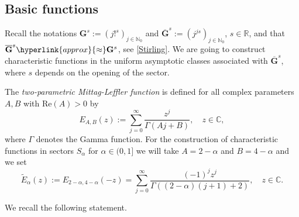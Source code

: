 \documentclass[11pt,a4paper]{article}
\theoremstyle{plain}
\theoremstyle{definition}
\newcommand{\RR}{\mathbb{R}}
\newcommand{\CC}{\mathbb{C}}
\newcommand{\NN}{\mathbb{N}}
\newcommand{\G}{\mathbf{G}}
\renewcommand{\Re}{\text{Re}}
\begin{document}
\subsection{Basic functions}\label{ssect.BasicFct}

Recall the notations {$\G^s:=(j!^s)_{j\in\NN_0}$ and }$\overline{\G}^s:=(j^{js})_{j\in\NN_0}$, $s\in\RR$, and that $\overline{\G}^s\hyperlink{approx}{\approx}\G^s$, see \eqref{Stirling}. We are going to construct characteristic functions in the uniform asymptotic classes associated with $\overline{\G}^s$, where $s$ depends on the opening of the sector.%


The \textit{{two-parametric} Mittag-Leffler function} is defined for all {complex parameters $A, B$ with $\Re(A)>0$} by
$$E_{A,B}(z):=\sum_{j=0}^\infty \frac{z^j}{\Gamma (Aj+B)},\quad z\in\CC,$$
where $\Gamma$ denotes the Gamma function.
For the construction of characteristic functions in sectors $S_\alpha$ for $\alpha\in(0,1]$ we will take $A=2-\alpha$ and $B=4-\alpha$ and we set
\begin{equation*}%
	\widetilde{E}_{\alpha}(z):=E_{2-\alpha, 4-\alpha}(-z){=\sum_{j=0}^\infty \frac{(-1)^jz^j}{\Gamma ((2-\alpha)(j+1)+2)},\quad z\in\CC}.
\end{equation*}

We recall the following statement.
\end{document}
